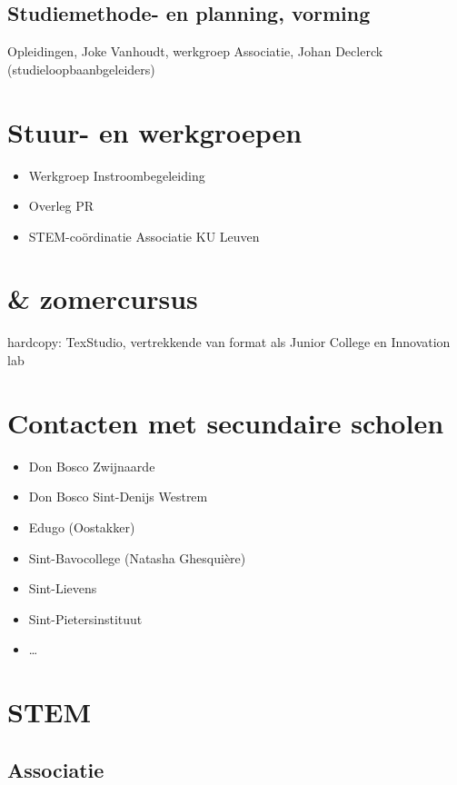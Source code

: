 \subsection{Studiemethode- en planning, vorming}
Opleidingen, Joke Vanhoudt, werkgroep Associatie, Johan Declerck (studieloopbaanbgeleiders)
\section{Stuur- en werkgroepen}
\begin{itemize}
	\item Werkgroep Instroombegeleiding
	\item Overleg PR 
	\item STEM-coördinatie Associatie KU Leuven
\end{itemize}

\section{ \& zomercursus }

hardcopy: TexStudio, vertrekkende van format als Junior College en Innovation lab
\section{Contacten met secundaire scholen}
\begin{itemize}
	\item Don Bosco Zwijnaarde
	\item Don Bosco Sint-Denijs Westrem
	\item Edugo (Oostakker)
	\item Sint-Bavocollege (Natasha Ghesquière)
	\item Sint-Lievens
	\item Sint-Pietersinstituut
	\item \ldots
\end{itemize}


\newpage

\section{STEM}

\subsection{Associatie}

